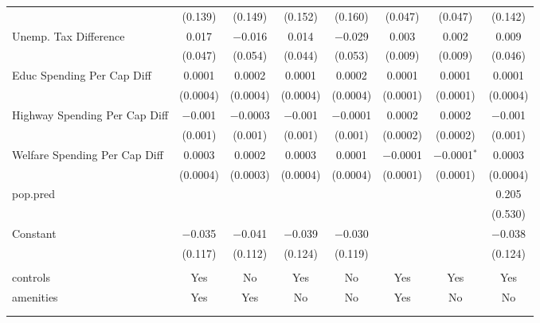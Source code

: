 \begin{table}[!htbp]
\begin{tabular}{@{\extracolsep{5pt}}lccccccc}
  & (0.139) & (0.149) & (0.152) & (0.160) & (0.047) & (0.047) & (0.142) \\ 
  Unemp. Tax Difference & 0.017 & $-$0.016 & 0.014 & $-$0.029 & 0.003 & 0.002 & 0.009 \\ 
  & (0.047) & (0.054) & (0.044) & (0.053) & (0.009) & (0.009) & (0.046) \\ 
  Educ Spending Per Cap Diff & 0.0001 & 0.0002 & 0.0001 & 0.0002 & 0.0001 & 0.0001 & 0.0001 \\ 
  & (0.0004) & (0.0004) & (0.0004) & (0.0004) & (0.0001) & (0.0001) & (0.0004) \\ 
  Highway Spending Per Cap Diff & $-$0.001 & $-$0.0003 & $-$0.001 & $-$0.0001 & 0.0002 & 0.0002 & $-$0.001 \\ 
  & (0.001) & (0.001) & (0.001) & (0.001) & (0.0002) & (0.0002) & (0.001) \\ 
  Welfare Spending Per Cap Diff & 0.0003 & 0.0002 & 0.0003 & 0.0001 & $-$0.0001 & $-$0.0001$^{*}$ & 0.0003 \\ 
  & (0.0004) & (0.0003) & (0.0004) & (0.0004) & (0.0001) & (0.0001) & (0.0004) \\ 
  pop.pred &  &  &  &  &  &  & 0.205 \\ 
  &  &  &  &  &  &  & (0.530) \\ 
  Constant & $-$0.035 & $-$0.041 & $-$0.039 & $-$0.030 &  &  & $-$0.038 \\ 
  & (0.117) & (0.112) & (0.124) & (0.119) &  &  & (0.124) \\ 
 \hline \\[-1.8ex] 
controls & Yes & No & Yes & No & Yes & Yes & Yes \\ 
amenities & Yes & Yes & No & No & Yes & No & No \\ 
\hline \\[-1.8ex] 
\hline 
\hline \\[-1.8ex] 
\end{tabular} 
\end{table} 
